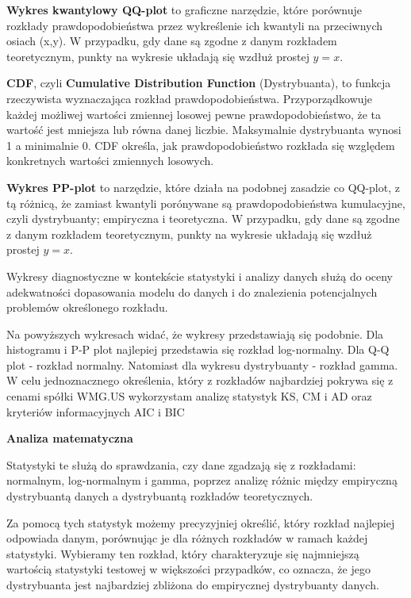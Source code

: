 \documentclass[a4paper,11pt]{article}
\begin{document}
\textbf{Wykres kwantylowy QQ-plot} to graficzne narzędzie, które porównuje rozkłady prawdopodobieństwa przez wykreślenie ich kwantyli na przeciwnych osiach (x,y). W przypadku, gdy dane są zgodne z danym rozkładem teoretycznym, punkty na wykresie układają się wzdłuż prostej \(y = x\).

\textbf{CDF}, czyli \textbf{Cumulative Distribution Function} (Dystrybuanta), to funkcja rzeczywista wyznaczająca rozkład prawdopodobieństwa. Przyporządkowuje każdej możliwej wartości zmiennej losowej pewne prawdopodobieństwo, że ta wartość jest mniejsza lub równa danej liczbie. Maksymalnie dystrybuanta wynosi 1 a minimalnie 0. CDF określa, jak prawdopodobieństwo rozkłada się względem konkretnych wartości zmiennych losowych.

\textbf{Wykres PP-plot} to narzędzie, które działa na podobnej zasadzie co QQ-plot, z tą różnicą, że zamiast kwantyli porónywane są prawdopodobieństwa kumulacyjne, czyli dystrybuanty; empiryczna i teoretyczna. W przypadku, gdy dane są zgodne z danym rozkładem teoretycznym, punkty na wykresie układają się wzdłuż prostej \(y = x\).

Wykresy diagnostyczne w kontekście statystyki i analizy danych służą do oceny adekwatności dopasowania modelu do danych i do znalezienia potencjalnych problemów określonego rozkładu.

Na powyższych wykresach widać, że wykresy przedstawiają się podobnie. Dla histogramu i P-P plot najlepiej przedstawia się rozkład log-normalny. Dla Q-Q plot - rozkład normalny. Natomiast dla wykresu dystrybuanty - rozkład gamma. W celu jednoznacznego określenia, który z rozkładów najbardziej pokrywa się z cenami spółki WMG.US wykorzystam analizę statystyk KS, CM i AD oraz kryteriów informacyjnych AIC i BIC

\vspace*{0.5cm}

\textbf{Analiza matematyczna}

Statystyki te służą do sprawdzania, czy dane zgadzają się z rozkładami: normalnym, log-normalnym i gamma, poprzez analizę różnic między empiryczną dystrybuantą danych a dystrybuantą rozkładów teoretycznych.

Za pomocą tych statystyk możemy precyzyjniej określić, który rozkład najlepiej odpowiada danym, porównując je dla różnych rozkładów w ramach każdej statystyki. Wybieramy ten rozkład, który charakteryzuje się najmniejszą wartością statystyki testowej w większości przypadków, co oznacza, że jego dystrybuanta jest najbardziej zbliżona do empirycznej dystrybuanty danych.
\end{document}
